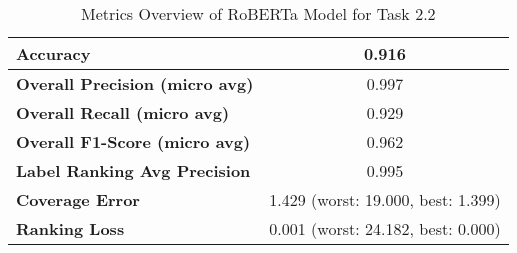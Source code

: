\begin{table}[H]
\begin{tabular}{|l|c|c|c|c|}
\textbf{Accuracy}                    & \multicolumn{4}{c|}{0.916}                                 \\ \hline
\textbf{Overall Precision (micro avg)}           & \multicolumn{4}{c|}{0.997}                                \\ \hline
\textbf{Overall Recall (micro avg)}              & \multicolumn{4}{c|}{0.929}                                   \\ \hline
\textbf{Overall F1-Score (micro avg)}            & \multicolumn{4}{c|}{0.962}                                  \\ \hline
\textbf{Label Ranking Avg Precision} & \multicolumn{4}{c|}{0.995}                                    \\ \hline
\textbf{Coverage Error}              & \multicolumn{4}{c|}{1.429 (worst: 19.000, best: 1.399)}                             \\ \hline
\textbf{Ranking Loss}                & \multicolumn{4}{c|}{0.001 (worst: 24.182, best: 0.000)}                             \\ \hline
\end{tabular}

\caption{Metrics Overview of RoBERTa Model for Task 2.2}
\label{table:roberta_metrics_task_02_2}
\end{table}
    